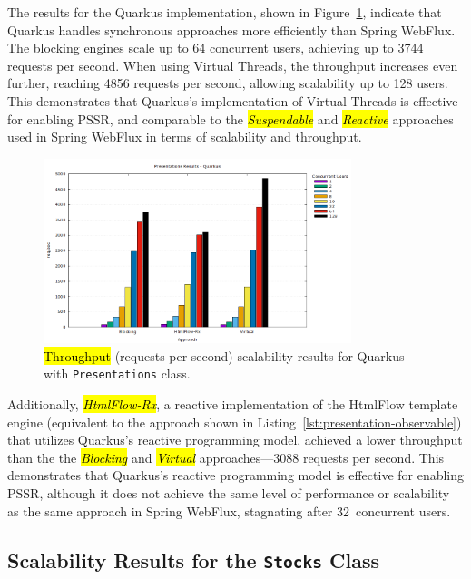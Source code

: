 \documentclass[software,article,accept,pdftex,moreauthors]{Definitions/mdpi}
\begin{document}
The results for the Quarkus implementation, shown in
Figure~\ref{fig:presentations-quarkus-jmeter}, indicate that Quarkus handles
synchronous approaches more efficiently than Spring WebFlux. The blocking
engines scale up to 64 concurrent users, achieving up to 3744 requests per
second. When using Virtual Threads, the throughput increases even further,
reaching 4856 requests per second, allowing scalability up to 128 users. This
demonstrates that Quarkus's implementation of Virtual Threads is effective for
enabling PSSR\@, and comparable to the \textit{\hl{Suspendable}} and
\textit{\hl{Reactive}} approaches used in Spring WebFlux in terms of scalability and
throughput.

\vspace{-3pt}
\begin{figure}[H]
     \includegraphics[width=0.8\textwidth]{./Graphs/presentations-quarkus-jmeter.png}
     \caption{\hl{Throughput} %
 (requests per second) scalability results for Quarkus with \texttt{Presentations} class.}\label{fig:presentations-quarkus-jmeter}
\end{figure}

Additionally, \textit{\hl{HtmlFlow-Rx}}, a reactive implementation of the HtmlFlow
template engine (equivalent to the approach shown in
Listing~\ref{lst:presentation-observable}) that utilizes Quarkus's reactive
programming model, achieved a lower throughput than the the \textit{\hl{Blocking}}
and \textit{\hl{Virtual}} approaches---3088 requests per second. This demonstrates
that Quarkus's reactive programming model is effective for enabling PSSR\@,
although it does not achieve the same level of performance or scalability as
the same approach in Spring WebFlux, stagnating after 32~concurrent users.

\subsection{Scalability Results for the \texttt{Stocks} Class} \label{sec:stocks-results}
\end{document}
